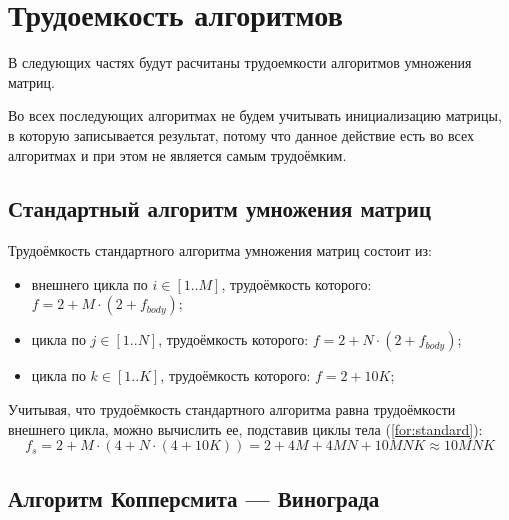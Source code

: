 \section{Трудоемкость алгоритмов}

В следующих частях будут расчитаны трудоемкости алгоритмов умножения матриц.

Во всех последующих алгоритмах не будем учитывать инициализацию матрицы, в которую записывается результат, потому что данное действие есть во всех алгоритмах и при этом не является самым трудоёмким.


\subsection{Стандартный алгоритм умножения матриц}

Трудоёмкость стандартного алгоритма умножения матриц состоит из:
\begin{itemize}
	\item внешнего цикла по $i \in [1..M]$, трудоёмкость которого: $f = 2 + M \cdot (2 + f_{body})$;
	\item цикла по $j \in [1..N]$, трудоёмкость которого: $f = 2 + N \cdot (2 + f_{body})$;
	\item цикла по $k \in [1..K]$, трудоёмкость которого: $f = 2 + 10K$;
\end{itemize}

Учитывая, что трудоёмкость стандартного алгоритма равна трудоёмкости внешнего цикла, можно вычислить ее, подставив циклы тела (\ref{for:standard}):
\begin{equation}
	\label{for:standard}
	f_{s} = 2 + M \cdot (4 + N \cdot (4 + 10K)) = 2 + 4M + 4MN + 10MNK \approx 10MNK
\end{equation}

\subsection{Алгоритм Копперсмита --- Винограда}

